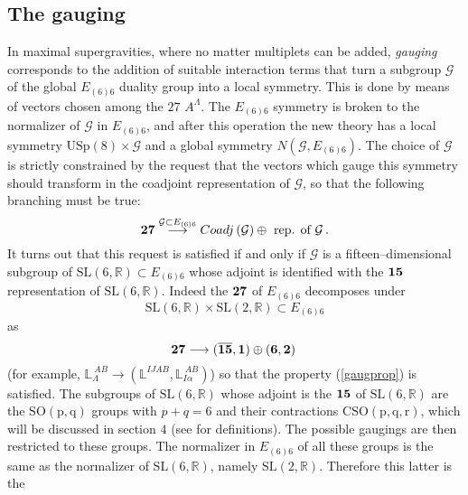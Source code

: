 \documentclass[a4paper,12pt]{article}
\def\bar{\overline}\end {picture}}
\begin{document}
\subsection{The gauging}
In maximal supergravities, where no matter multiplets can be added,
{\it gauging} corresponds to the addition of suitable
interaction terms that turn  a subgroup $\mathcal{G}$ of the global
$E_{\left(6\right)6}$ duality group into a local symmetry.
This is done by means of vectors chosen among the $27$ $A^{\Lambda}$.
The $E_{\left(6\right)6}$ symmetry is broken to the normalizer of
$\mathcal{G}$ in
$E_{\left(6\right)6}$, and after this operation
 the new theory has a local symmetry $\mathrm{USp(8)}\times\mathcal{G}$
and a global symmetry $N(\mathcal{G},E_{\left(6\right)6})$.
The choice of $\mathcal{G}$ is strictly constrained by the request that the vectors which
gauge this symmetry should transform in the coadjoint representation of $\mathcal{G}$,
so that the following branching must be true:
\begin{equation}
\label{gaugprop}
{\bf 27}\stackrel{\mathcal{G}\subset E_{\left(6\right)6}}{\longrightarrow}
Coadj\left(\mathcal{G}\right)\oplus\hbox{~rep. of~}\mathcal{G}\,.
\end{equation}
It turns out that this request is satisfied if and only if
$\mathcal{G}$ is a fifteen--dimensional
subgroup of $\mathrm{SL}(6,\mathbb{R})\subset E_{\left(6\right)6}$ whose adjoint
is identified with the $\bf 15$ representation of
$\mathrm{SL}(6,\mathbb{R})$. Indeed the $\bf 27$ of $E_{\left(6\right)6}$ decomposes under
\begin{equation}
\mathrm{SL}(6,\mathbb{R})\times \mathrm{SL}(2,\mathbb{R})\subset E_{\left(6\right)6}
\end{equation}
as
\begin{equation}
\bf 27 \longrightarrow ({\bar{15}},1)\oplus (6,2)\,
\end{equation}
(for example, $\mathbb{L}_{\Lambda}^{~AB}\longrightarrow
 (\mathbb{L}^{IJAB},\mathbb{L}_{I\alpha}^{~AB})$)
so that the property (\ref{gaugprop}) is satisfied. The subgroups
of $\mathrm{SL}(6,\mathbb{R})$ whose adjoint is the $\bf 15$ of
$\mathrm{SL}(6,\mathbb{R})$ are the $\mathrm{SO(p,q)}$ groups with
$p+q=6$ and their contractions $\mathrm{CSO}\mathrm{(p,q,r)}$,
which will be discussed in section $4$ (see
\cite{hull,hull2,noi4D} for definitions). The possible gaugings
are then restricted to these groups. The normalizer in
$E_{\left(6\right)6}$ of all these groups is the same as the
normalizer of $\mathrm{SL}(6,\mathbb{R}) $, namely
 $\mathrm{SL}(2,\mathbb{R})$. Therefore this latter is the
\end{document}
